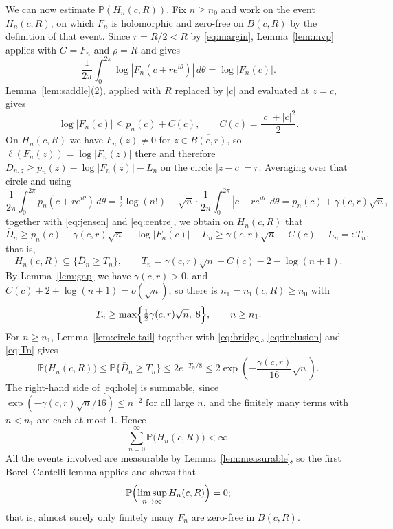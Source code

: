 \documentclass[plain]{baustms}
\newcommand{\Pp}{\mathbb P}
\theoremstyle{cupthm}
\begin{document}
We can now estimate $\Pp(H_n(c,R))$. Fix $n\geq n_0$ and work on the event
$H_n(c,R)$, on which $F_n$ is holomorphic and zero-free on $B(c,R)$ by the
definition of that event. Since $r=R/2<R$ by \eqref{eq:margin},
Lemma~\ref{lem:mvp} applies with $G=F_n$ and $\rho=R$ and gives
\begin{equation}\label{eq:jensen}
 \frac1{2\pi}\int_0^{2\pi}\log|F_n(c+re^{i\theta})|\,d\theta
 =\log|F_n(c)| .
\end{equation}
Lemma~\ref{lem:saddle}(2), applied with $R$ replaced by $|c|$ and evaluated
at $z=c$, gives
\begin{equation}\label{eq:centre}
 \log|F_n(c)|\leq p_n(c)+C(c),\qquad C(c)=\frac{|c|+|c|^2}{2}.
\end{equation}
On $H_n(c,R)$ we have $F_n(z)\neq0$ for $z\in\overline{B(c,r)}$, so
$\ell(F_n(z))=\log|F_n(z)|$ there and therefore
$D_{n,z}\geq p_n(z)-\log|F_n(z)|-L_n$ on the circle $|z-c|=r$. Averaging over
that circle and using
\[
 \frac1{2\pi}\int_0^{2\pi}p_n(c+re^{i\theta})\,d\theta
 =\tfrac12\log(n!)+\sqrt n\cdot\frac1{2\pi}\int_0^{2\pi}|c+re^{i\theta}|\,d\theta
 =p_n(c)+\gamma(c,r)\sqrt n,
\]
together with \eqref{eq:jensen} and \eqref{eq:centre}, we obtain on
$H_n(c,R)$ that
\[
 \overline D_n
 \geq p_n(c)+\gamma(c,r)\sqrt n-\log|F_n(c)|-L_n
 \geq\gamma(c,r)\sqrt n-C(c)-L_n=:T_n,
\]
that is,
\begin{equation}\label{eq:inclusion}
 H_n(c,R)\subseteq\{\overline D_n\geq T_n\},
 \qquad
 T_n=\gamma(c,r)\sqrt n-C(c)-2-\log(n+1).
\end{equation}
By Lemma~\ref{lem:gap} we have $\gamma(c,r)>0$, and
$C(c)+2+\log(n+1)=o(\sqrt n)$, so there is $n_1=n_1(c,R)\geq n_0$ with
\begin{equation}\label{eq:Tn}
 T_n\geq\max\Bigl\{\tfrac12\gamma(c,r)\sqrt n,\;8\Bigr\},
 \qquad n\geq n_1 .
\end{equation}
For $n\geq n_1$, Lemma~\ref{lem:circle-tail} together with
\eqref{eq:bridge}, \eqref{eq:inclusion} and \eqref{eq:Tn} gives
\begin{equation}\label{eq:hole}
 \Pp\bigl(H_n(c,R)\bigr)\leq\Pp\{\overline D_n\geq T_n\}
 \leq2e^{-T_n/8}
 \leq2\exp\left(-\frac{\gamma(c,r)}{16}\sqrt n\right).
\end{equation}
The right-hand side of \eqref{eq:hole} is summable, since
$\exp(-\gamma(c,r)\sqrt n/16)\leq n^{-2}$ for all large $n$, and the finitely
many terms with $n<n_1$ are each at most $1$. Hence
\begin{equation}\label{eq:summable-holes}
 \sum_{n=0}^{\infty}\Pp\bigl(H_n(c,R)\bigr)<\infty .
\end{equation}
All the events involved are measurable by Lemma~\ref{lem:measurable}, so the
first Borel--Cantelli lemma \cite[Section~2.3]{Durrett} applies and shows
that
\begin{equation}\label{eq:bc}
 \Pp\Bigl(\limsup_{n\to\infty}H_n(c,R)\Bigr)=0;
\end{equation}
that is, almost surely only finitely many $F_n$ are zero-free in $B(c,R)$.
\end{document}
